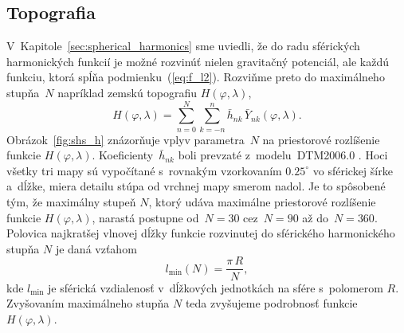 \documentclass[a4paper,12pt]{book}
\begin{document}
\subsection{Topografia}
\label{sec:sh_applications_topography}

V~Kapitole~\ref{sec:spherical_harmonics} sme uviedli, že do radu sférických
harmonických funkcií je možné rozvinúť nielen gravitačný potenciál, ale každú
funkciu, ktorá spĺňa podmienku~(\ref{eq:f_l2}).  Rozviňme preto do maximálneho 
stupňa~$N$ napríklad zemskú topografiu $H(\varphi, \lambda)$,
%
\begin{equation}
\label{eq:h_shs}
H(\varphi, \lambda) = \sum_{n = 0}^{N} \sum_{k = -n}^n \bar{h}_{nk} \,
\bar{Y}_{nk}(\varphi, \lambda){.}
\end{equation}
%
Obrázok~\ref{fig:shs_h} znázorňuje vplyv parametra~$N$ na priestorové 
rozlíšenie funkcie $H(\varphi, \lambda)$.  Koeficienty~$\bar{h}_{nk}$ boli 
prevzaté z~modelu~DTM2006.0 \parencite{DTM2006}.  Hoci všetky tri mapy sú 
vypočítané s~rovnakým vzorkovaním $0.25^{\circ}$ vo sférickej šírke a~dĺžke, 
miera detailu stúpa od vrchnej mapy smerom nadol.  Je to spôsobené tým, že 
maximálny stupeň $N$, ktorý udáva maximálne priestorové rozlíšenie funkcie 
$H(\varphi,\lambda)$, narastá postupne od~$N = 30$ cez~$N = 90$ až do~$N 
= 360$.  Polovica najkratšej vlnovej dĺžky funkcie rozvinutej do sférického 
harmonického stupňa $N$ je daná vzťahom
%
\begin{equation}
l_{\min}(N) = \frac{\pi \, R}{N}{,}
\end{equation}
%
kde $l_{\min}$ je sférická vzdialenosť v~dĺžkových jednotkách na sfére 
s~polomerom $R$.  Zvyšovaním
maximálneho stupňa $N$ teda zvyšujeme podrobnosť funkcie $H(\varphi, \lambda)$.
\end{document}

